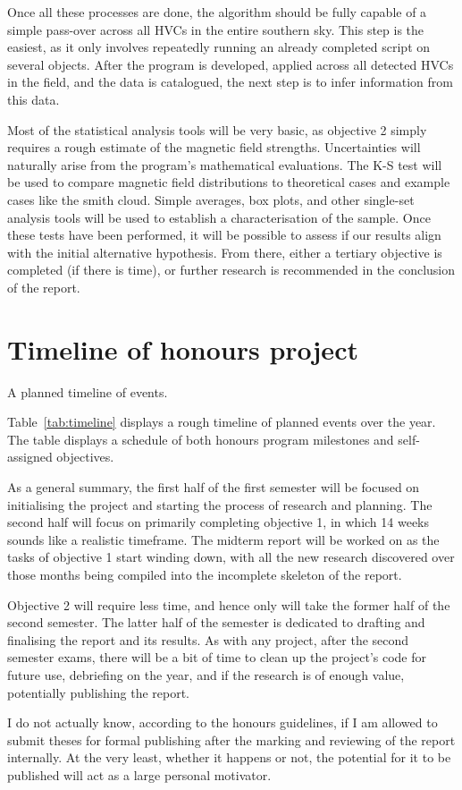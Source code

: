 Once all these processes are done, the algorithm should be fully capable of a simple pass-over across all HVCs in the entire southern sky. This step is the easiest, as it only involves repeatedly running an already completed script on several objects. After the program is developed, applied across all detected HVCs in the field, and the data is catalogued, the next step is to infer information from this data.

Most of the statistical analysis tools will be very basic, as objective 2 simply requires a rough estimate of the magnetic field strengths. Uncertainties will naturally arise from the program's mathematical evaluations. The K-S test will be used to compare magnetic field distributions to theoretical cases and example cases like the smith cloud. Simple averages, box plots, and other single-set analysis tools will be used to establish a characterisation of the sample. Once these tests have been performed, it will be possible to assess if our results align with the initial alternative hypothesis. From there, either a tertiary objective is completed (if there is time), or further research is recommended in the conclusion of the report.

\section{Timeline of honours project}
\label{sec:timeline}

\begin{table}[ht]
  \centering
  
  \caption{A planned timeline of events.}
  \label{tab:timeline}
\end{table}

Table~\ref{tab:timeline} displays a rough timeline of planned events over the year. The table displays a schedule of both honours program milestones and self-assigned objectives.

As a general summary, the first half of the first semester will be focused on initialising the project and starting the process of research and planning. The second half will focus on primarily completing objective 1, in which 14 weeks sounds like a realistic timeframe. The midterm report will be worked on as the tasks of objective 1 start winding down, with all the new research discovered over those months being compiled into the incomplete skeleton of the report.

Objective 2 will require less time, and hence only will take the former half of the second semester. The latter half of the semester is dedicated to drafting and finalising the report and its results. As with any project, after the second semester exams, there will be a bit of time to clean up the project's code for future use, debriefing on the year, and if the research is of enough value, potentially publishing the report.

I do not actually know, according to the honours guidelines, if I am allowed to submit theses for formal publishing after the marking and reviewing of the report internally. At the very least, whether it happens or not, the potential for it to be published will act as a large personal motivator.


